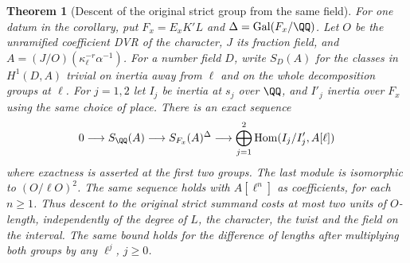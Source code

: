 \documentclass[a4paper,11pt]{article}
\newtheorem{theorem}[proposition]{Theorem}
\theoremstyle{definition}
\theoremstyle{remark}
\numberwithin{equation}{section}
\begin{document}
\begin{theorem}[Descent of the original strict group from the same field]
\label{thm:descent240}
For one datum in the corollary, put \(F_x=E_xK'L\) and
\(\Delta=\operatorname{Gal}(F_x/\QQ)\). Let \(O\) be the
unramified coefficient DVR of the character, \(J\) its
fraction field, and \(A=(J/O)(\kappa_\ell^{-r}\alpha^{-1})\).
For a number field \(D\), write \(S_D(A)\) for the classes in
\(H^1(D,A)\) trivial on inertia away from \(\ell\) and on the
whole decomposition groups at \(\ell\). For \(j=1,2\) let
\(I_j\) be inertia at \(s_j\) over \(\QQ\), and \(I'_j\) inertia
over \(F_x\) using the same choice of place. There is an exact sequence
\[
 0\longrightarrow S_{\QQ}(A)
 \longrightarrow S_{F_x}(A)^\Delta
 \longrightarrow
     \bigoplus_{j=1}^2\operatorname{Hom}(I_j/I'_j,A[\ell])
\]
where exactness is asserted at the first two groups. The last
module is isomorphic to \((O/\ell O)^2\). The same sequence
holds with \(A[\ell^n]\) as coefficients, for each \(n\ge1\).
Thus descent to the original strict summand costs at most two
units of \(O\)-length, independently of the degree of \(L\),
the character, the twist and the field on the interval. The
same bound holds for the difference of lengths after multiplying
both groups by any \(\ell^j\), \(j\ge0\).
\end{theorem}
\end{document}
